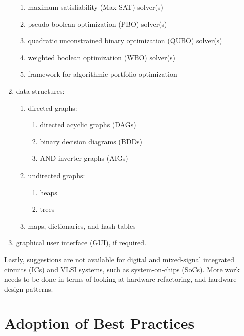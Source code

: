\documentclass[letter,12pt]{article}
\begin{document}
\begin{enumerate}
\begin{enumerate}
	\item maximum satisfiability (Max-SAT) solver(s)
	\item pseudo-boolean optimization (PBO) solver(s)
	\item quadratic unconstrained binary optimization (QUBO) solver(s)
	\item weighted boolean optimization (WBO) solver(s)
	\item framework for algorithmic portfolio optimization
	\end{enumerate}
\item data structures: \vspace{-0.3cm}
	\begin{enumerate} \itemsep -2pt
	\item directed graphs: \vspace{-0.2cm}
		\begin{enumerate} \itemsep -2pt
		\item directed acyclic graphs (DAGs)
		\item binary decision diagrams (BDDs)
		\item AND-inverter graphs (AIGs)
		\end{enumerate}
	\item undirected graphs: \vspace{-0.2cm}
		\begin{enumerate} \itemsep -2pt
		\item heaps
		\item trees
		\end{enumerate}
	\item maps, dictionaries, and hash tables
	\end{enumerate}
\item graphical user interface (GUI), if required.
\end{enumerate}




Lastly, suggestions are not available for digital and mixed-signal integrated circuits (ICs) and VLSI systems, such as system-on-chips (SoCs). More work needs to be done in terms of looking at hardware refactoring, and hardware design patterns.




\section{Adoption of Best Practices}
\label{sec:AdoptionOfBestPractices}
\end{document}
